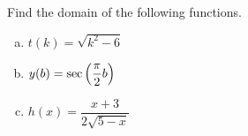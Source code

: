 \documentclass[notes]{subfiles}
\begin{document}
		\begin{ex}
			Find the domain of the following functions.
			\begin{enumerate}[(a)]
				\item $t(k) = \sqrt{k^2-6}$
					
				\item $y(b) = \sec\left( \dfrac{\pi}{2}b\right)$
					
				\item $h(x) = \dfrac{x+3}{2\sqrt{5-x}}$
					
			\end{enumerate}
		\end{ex}
 	\clearpage
\end{document}
